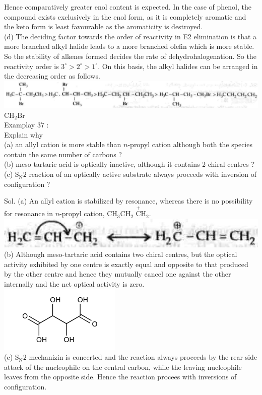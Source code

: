 \documentclass[10pt]{article}
\begin{document}
Hence comparatively greater enol content is expected. In the case of phenol, the compound exists exclusively in the enol form, as it is completely aromatic and the keto form is least favourable as the aromaticity is destroyed.\\
(d) The deciding factor towards the order of reactivity in E2 elimination is that a more branched alkyl halide leads to a more branched olefin which is more stable. So the stability of alkenes formed decides the rate of dehydrohalogenation. So the reactivity order is $3^{\circ}>2^{\circ}>1^{\circ}$. On this basis, the alkyl halides can be arranged in the decreasing order as follows.\\
\includegraphics[max width=\textwidth, center]{2025_01_28_8470952b98110cec3aabg-128(2)}\\
$\mathrm{CH}_{2} \mathrm{Br}$\\
Examplay 37 :\\
Explain why\\
(a) an allyl cation is more stable than $n$-propyl cation although both the species contain the same number of carbons ?\\
(b) meso tartaric acid is optically inactive, although it contains 2 chiral centres ?\\
(c) $\mathrm{S}_{\mathrm{N}} 2$ reaction of an optically active substrate always proceeds with inversion of configuration ?

Sol. (a) An allyl cation is stabilized by resonance, whereas there is no possibility for resonance in $n$-propyl cation, $\mathrm{CH}_{3} \mathrm{CH}_{2}$ $\stackrel{+}{\mathrm{C}} \mathrm{H}_{2}$.\\
\includegraphics[max width=\textwidth, center]{2025_01_28_8470952b98110cec3aabg-128}\\
(b) Although meso-tartaric acid contains two chiral centres, but the optical activity exhibited by one centre is exactly equal and opposite to that produced by the other centre and hence they mutually cancel one against the other internally and the net optical activity is zero.\\
\includegraphics{smile-a0bd496b278b163e0acbf4316215b97529aa3d29}\\
(c) $\mathrm{S}_{\mathrm{N}} 2$ mechanizin is concerted and the reaction always proceeds by the rear side attack of the nucleophile on the central carbon, while the leaving nucleophile leaves from the opposite side. Hence the reaction procees with inversions of configuration.
\end{document}
